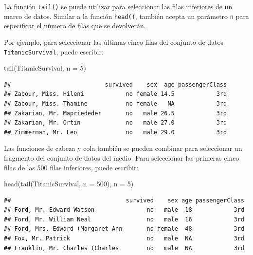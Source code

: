 \documentclass[
]{book}
\newenvironment{Shaded}{\begin{snugshade}}{\end{snugshade}}
\newcommand{\AttributeTok}[1]{\textcolor[rgb]{0.77,0.63,0.00}{#1}}
\newcommand{\DecValTok}[1]{\textcolor[rgb]{0.00,0.00,0.81}{#1}}
\newcommand{\FunctionTok}[1]{\textcolor[rgb]{0.00,0.00,0.00}{#1}}
\newcommand{\NormalTok}[1]{#1}
\begin{document}
La función \texttt{tail()} se puede utilizar para seleccionar las filas inferiores de un marco de datos. Similar a la función \texttt{head()}, también acepta un parámetro \texttt{n} para especificar el número de filas que se devolverán.

Por ejemplo, para seleccionar las últimas cinco filas del conjunto de datos \texttt{TitanicSurvival}, puede escribir:

\begin{Shaded}
\begin{Highlighting}[]
\FunctionTok{tail}\NormalTok{(TitanicSurvival, }\AttributeTok{n =} \DecValTok{5}\NormalTok{)}
\end{Highlighting}
\end{Shaded}

\begin{verbatim}
##                           survived    sex  age passengerClass
## Zabour, Miss. Hileni            no female 14.5            3rd
## Zabour, Miss. Thamine           no female   NA            3rd
## Zakarian, Mr. Mapriededer       no   male 26.5            3rd
## Zakarian, Mr. Ortin             no   male 27.0            3rd
## Zimmerman, Mr. Leo              no   male 29.0            3rd
\end{verbatim}

Las funciones de cabeza y cola también se pueden combinar para seleccionar un fragmento del conjunto de datos del medio. Para seleccionar las primeras cinco filas de las 500 filas inferiores, puede escribir:

\begin{Shaded}
\begin{Highlighting}[]
\FunctionTok{head}\NormalTok{(}\FunctionTok{tail}\NormalTok{(TitanicSurvival, }\AttributeTok{n =} \DecValTok{500}\NormalTok{), }\AttributeTok{n =} \DecValTok{5}\NormalTok{)}
\end{Highlighting}
\end{Shaded}

\begin{verbatim}
##                                 survived    sex age passengerClass
## Ford, Mr. Edward Watson               no   male  18            3rd
## Ford, Mr. William Neal                no   male  16            3rd
## Ford, Mrs. Edward (Margaret Ann       no female  48            3rd
## Fox, Mr. Patrick                      no   male  NA            3rd
## Franklin, Mr. Charles (Charles        no   male  NA            3rd
\end{verbatim}
\end{document}

